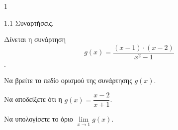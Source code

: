 \begin{ylh}{1}
    \item 1.1 Συναρτήσεις.
\end{ylh}
Δίνεται η συνάρτηση \[ g(x) = \frac{(x-1)\cdot(x-2)}{x^2 - 1} \].
\begin{alist}
    \item Να βρείτε το πεδίο ορισμού της συνάρτησης $g(x)$. 
    \item Να αποδείξετε ότι η $g(x) = \dfrac{x-2}{x+1}$. 
    \item Να υπολογίσετε το όριο $\lim\limits_{x\to1} g(x)$. 
\end{alist}

